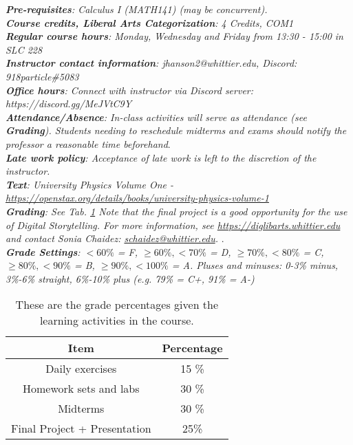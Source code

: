 \documentclass[10pt]{article}
\begin{document}
\noindent
\textit{\textbf{Pre-requisites}: Calculus I (MATH141) (may be concurrent).} \\
\textit{\textbf{Course credits, Liberal Arts Categorization}: 4 Credits, COM1} \\
\textit{\textbf{Regular course hours}: Monday, Wednesday and Friday from 13:30 - 15:00 in SLC 228} \\
\textit{\textbf{Instructor contact information}: jhanson2@whittier.edu, Discord: 918particle\#5083} \\
\textit{\textbf{Office hours}: Connect with instructor via Discord server: https://discord.gg/MeJVtC9Y} \\
\textit{\textbf{Attendance/Absence}: In-class activities will serve as attendance (see \textbf{Grading}). Students needing to reschedule midterms and exams should notify the professor a reasonable time beforehand}.\\ 
\textit{\textbf{Late work policy}: Acceptance of late work is left to the discretion of the instructor.} \\
\textit{\textbf{Text}: University Physics Volume One - \url{https://openstax.org/details/books/university-physics-volume-1}} \\
\textit{\textbf{Grading}: See Tab. \ref{tab:grades}  Note that the final project is a good opportunity for the use of Digital Storytelling.  For more information, see \url{https://diglibarts.whittier.edu} and contact Sonia Chaidez: \url{schaidez@whittier.edu}. }. \\
\textit{\textbf{Grade Settings}: $<60\%$ = F, $\geq 60\%, <70\%$ = D, $\geq 70\%, <80\%$ = C, $\geq 80\%, <90\%$ = B, $\geq 90\%, <100\%$ = A.  Pluses and minuses: 0-3\% minus, 3\%-6\% straight, 6\%-10\% plus (e.g. 79\% = C+, 91\% = A-)} \\
\begin{table}[h]
\centering
\begin{tabular}{| c | c |}
\hline
Item & Percentage \\ \hline \hline
Daily exercises & 15 \% \\ \hline
Homework sets and labs & 30 \% \\ \hline
Midterms & 30 \% \\ \hline
Final Project + Presentation & 25\% \\ \hline
\end{tabular}
\caption{\label{tab:grades} These are the grade percentages given the learning activities in the course.}
\end{table} \\
\end{document}
